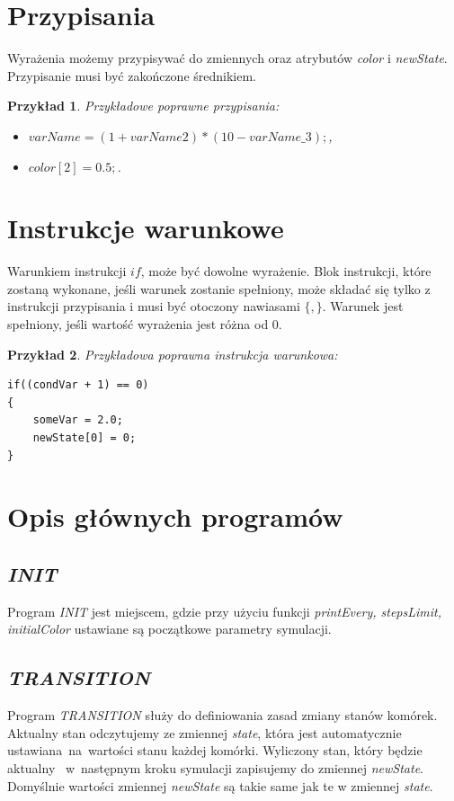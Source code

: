 \documentclass[declaration,shortabstract, inz]{iithesis}
\theoremstyle{definition} \newtheorem{definition}{Definicja}[]
\theoremstyle{plain} \newtheorem{remark}[definition]{Obserwacja}
\theoremstyle{plain} \newtheorem{theorem}[definition]{Twierdzenie}
\theoremstyle{plain} \newtheorem{example}{Przykład}[definition]
\theoremstyle{plain} \newtheorem{lemma}[definition]{Lemat}
\begin{document}
\section{Przypisania}
Wyrażenia możemy przypisywać do zmiennych oraz atrybutów \textit{color} i \textit{newState}. Przypisanie musi być zakończone średnikiem.

\begin{example}
Przykładowe poprawne przypisania:
\begin{itemize}
\item $varName = (1 + varName2) * (10 - varName\_3);$,
\item $color[2] = 0.5;$.
\end{itemize}
\end{example}

\section{Instrukcje warunkowe}
Warunkiem instrukcji $if$, może być dowolne wyrażenie. Blok instrukcji, które zostaną wykonane, jeśli warunek zostanie spełniony, może składać się tylko z instrukcji przypisania i musi być otoczony nawiasami $\{, \}$. Warunek jest spełniony, jeśli wartość wyrażenia jest różna od $0$.

\begin{example}
Przykładowa poprawna instrukcja warunkowa:
\begin{center}
\begin{lstlisting}
if((condVar + 1) == 0)
{
	someVar = 2.0;
	newState[0] = 0;
}
\end{lstlisting}
\end{center}
\end{example}

\section{Opis głównych programów}

\subsection{\textit{INIT}}
Program \textit{INIT} jest miejscem, gdzie przy użyciu funkcji \textit{printEvery, stepsLimit, initialColor} ustawiane są początkowe parametry symulacji.

\subsection{\textit{TRANSITION}}
Program \textit{TRANSITION} służy do definiowania zasad zmiany stanów komórek. Aktualny stan odczytujemy ze zmiennej \textit{state}, która jest automatycznie ustawiana~na~wartości stanu każdej komórki. Wyliczony stan, który będzie aktualny ~w~następnym kroku symulacji zapisujemy do zmiennej \textit{newState}. Domyślnie wartości zmiennej \textit{newState} są takie same jak te w zmiennej \textit{state}.
\end{document}
